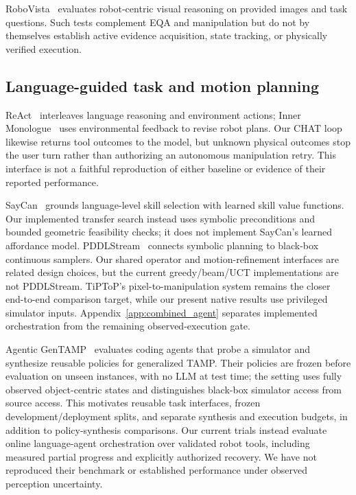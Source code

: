 RoboVista~\citep{xie2026robovista} evaluates robot-centric visual reasoning on
provided images and task questions. Such tests complement EQA and manipulation
but do not by themselves establish active evidence acquisition, state tracking,
or physically verified execution.


\subsection{Language-guided task and motion planning}

ReAct~\citep{yao2023react} interleaves language reasoning and environment actions;
Inner Monologue~\citep{huang2023innermonologue} uses environmental feedback to
revise robot plans. Our CHAT loop likewise returns tool outcomes to the model,
but unknown physical outcomes stop the user turn rather than authorizing an
autonomous manipulation retry. This interface is not a faithful reproduction of
either baseline or evidence of their reported performance.

SayCan~\citep{ahn2022saycan} grounds language-level skill selection with learned
skill value functions. Our implemented transfer search instead uses symbolic
preconditions and bounded geometric feasibility checks; it does not implement
SayCan's learned affordance model. PDDLStream~\citep{garrett2020pddlstream}
connects symbolic planning to black-box continuous samplers. Our shared operator
and motion-refinement interfaces are related design choices, but the current
greedy/beam/UCT implementations are not PDDLStream. TiPToP's pixel-to-manipulation
system remains the closer end-to-end comparison target, while our present native
results use privileged simulator inputs. Appendix~\ref{app:combined_agent}
separates implemented orchestration from the remaining observed-execution gate.

Agentic GenTAMP~\citep{merler2026agenticgentamp} evaluates coding agents that probe a simulator and
synthesize reusable policies for generalized TAMP. Their policies are frozen
before evaluation on unseen instances, with no LLM at test time; the setting
uses fully observed object-centric states and distinguishes black-box simulator
access from source access. This motivates reusable task interfaces, frozen
development/deployment splits, and separate synthesis and execution budgets,
in addition to policy-synthesis comparisons. Our current trials
instead evaluate online language-agent orchestration over validated robot tools,
including measured partial progress and explicitly authorized recovery. We have
not reproduced their benchmark or established performance under observed
perception uncertainty.

